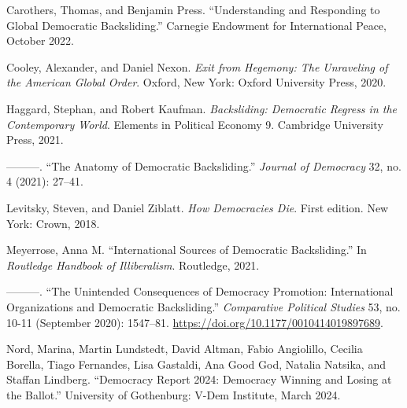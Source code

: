 \documentclass[
  letterpaper,
  DIV=11,
  numbers=noendperiod]{scrartcl}
\newlength{\cslhangindent}
\newenvironment{CSLReferences}[2] %
 {\begin{list}{}{%
  \setlength{\itemindent}{0pt}
  \setlength{\leftmargin}{0pt}
  \setlength{\parsep}{0pt}
  \ifodd #1
   \setlength{\leftmargin}{\cslhangindent}
   \setlength{\itemindent}{-1\cslhangindent}
  \fi
  \setlength{\itemsep}{#2\baselineskip}}}
 {\end{list}}
\begin{document}
\label{refs}
\begin{CSLReferences}{1}{0}
Carothers, Thomas, and Benjamin Press. {``Understanding and {Responding}
to {Global Democratic Backsliding}.''} Carnegie Endowment for
International Peace, October 2022.

Cooley, Alexander, and Daniel Nexon. \emph{Exit from {Hegemony}: {The
Unraveling} of the {American Global Order}}. Oxford, New York: Oxford
University Press, 2020.

Haggard, Stephan, and Robert Kaufman. \emph{Backsliding: {Democratic
Regress} in the {Contemporary World}}. Elements in {Political Economy}
9. Cambridge University Press, 2021.

---------. {``The {Anatomy} of {Democratic Backsliding}.''}
\emph{Journal of Democracy} 32, no. 4 (2021): 27--41.

Levitsky, Steven, and Daniel Ziblatt. \emph{How {Democracies Die}}.
First edition. New York: Crown, 2018.

Meyerrose, Anna M. {``International {Sources} of {Democratic
Backsliding}.''} In \emph{Routledge {Handbook} of {Illiberalism}}.
Routledge, 2021.

---------. {``The {Unintended Consequences} of {Democracy Promotion}:
{International Organizations} and {Democratic Backsliding}.''}
\emph{Comparative Political Studies} 53, no. 10-11 (September 2020):
1547--81. \url{https://doi.org/10.1177/0010414019897689}.

Nord, Marina, Martin Lundstedt, David Altman, Fabio Angiolillo, Cecilia
Borella, Tiago Fernandes, Lisa Gastaldi, Ana Good God, Natalia Natsika,
and Staffan Lindberg. {``Democracy {Report} 2024: {Democracy Winning}
and {Losing} at the {Ballot}.''} University of Gothenburg: V-Dem
Institute, March 2024.

\end{CSLReferences}
\end{document}
